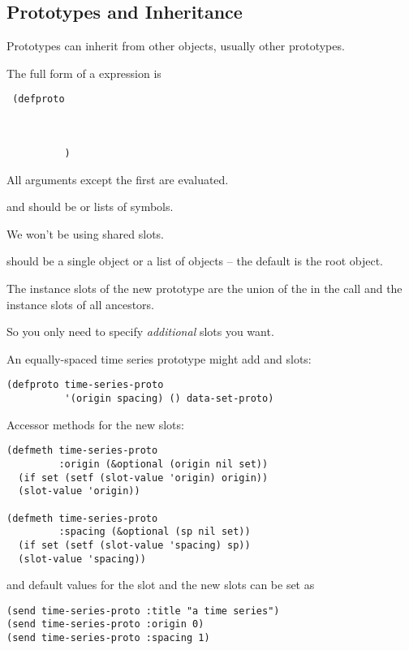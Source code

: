 \begin{slide}{}
\subsection{Prototypes and Inheritance}
Prototypes can inherit from other objects, usually other prototypes.

The full form of a  expression is
\begin{flushleft}\Large\tt
(defproto \\
~~~~~~~~~~\\
~~~~~~~~~~\\
~~~~~~~~~~\\
~~~~~~~~~~)
\end{flushleft}
All arguments except the first are evaluated.

 and  should be 
or lists of symbols.

We won't be using shared slots.

 should be a single object or a list of objects -- the
default is the root object.

The instance slots of the new prototype are
the union of the  in the call and the 
instance slots of all ancestors.

So you only need to specify {\em additional}\/ slots you want.
\end{slide}

\begin{slide}{}
An equally-spaced time series prototype might add  and
 slots:
{\Large
\begin{verbatim}
(defproto time-series-proto
          '(origin spacing) () data-set-proto)
\end{verbatim}}
Accessor methods for the new slots:
{\Large
\begin{verbatim}
(defmeth time-series-proto
         :origin (&optional (origin nil set))
  (if set (setf (slot-value 'origin) origin))
  (slot-value 'origin))

(defmeth time-series-proto
         :spacing (&optional (sp nil set))
  (if set (setf (slot-value 'spacing) sp))
  (slot-value 'spacing))
\end{verbatim}}
and default values for the  slot and the new slots can be
set as
{\Large
\begin{verbatim}
(send time-series-proto :title "a time series")
(send time-series-proto :origin 0)
(send time-series-proto :spacing 1)
\end{verbatim}}
\end{slide}

